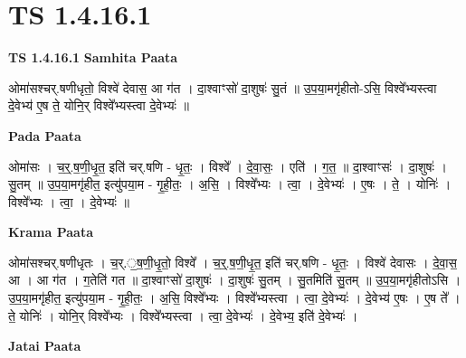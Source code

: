 \documentclass[17pt]{extarticle}
\begin{document}
\section*{ TS 1.4.16.1 }

\textbf{TS 1.4.16.1 } \newline
\textbf{Samhita Paata} \newline

ओमा॑सश्चर्.षणीधृतो॒ विश्वे॑ देवास॒ आ ग॑त । दा॒श्वाꣳसो॑ दा॒शुषः॑ सु॒तं ॥ उ॒प॒या॒मगृ॑हीतो-ऽसि॒ विश्वे᳚भ्यस्त्वा दे॒वेभ्य॑ ए॒ष ते॒ योनि॒र् विश्वे᳚भ्यस्त्वा दे॒वेभ्यः॑ ॥ \newline

\textbf{Pada Paata} \newline

ओमा॑सः । च॒र्॒.ष॒णी॒धृ॒त॒ इति॑ चर्.षणि - धृ॒तः॒ । विश्वे᳚ । दे॒वा॒सः॒ । एति॑ । ग॒त॒ ॥ दा॒श्वाꣳसः॑ । दा॒शुषः॑ । सु॒तम् ॥ उ॒प॒या॒मगृ॑हीत॒ इत्यु॑पया॒म - गृ॒ही॒तः॒ । अ॒सि॒ । विश्वे᳚भ्यः । त्वा॒ । दे॒वेभ्यः॑ । ए॒षः । ते॒ । योनिः॑ । विश्वे᳚भ्यः । त्वा॒ । दे॒वेभ्यः॑ ॥  \newline


\textbf{Krama Paata} \newline

ओमा॑सश्चर्.षणीधृतः । च॒र्.॒ष॒णी॒धृ॒तो॒ विश्वे᳚ । च॒र्॒.ष॒णी॒धृ॒त॒ इति॑ चर्.षणि - धृ॒तः॒ । विश्वे॑ देवासः । दे॒वा॒स॒ आ । आ ग॑त । ग॒तेति॑ गत ॥ दा॒श्वाꣳसो॑ दा॒शुषः॑ । दा॒शुषः॑ सु॒तम् । सु॒तमिति॑ सु॒तम् ॥ उ॒प॒या॒मगृ॑हीतोऽसि । उ॒प॒या॒मगृ॑हीत॒ इत्यु॑पया॒म - गृ॒ही॒तः॒ । अ॒सि॒ विश्वे᳚भ्यः । विश्वे᳚भ्यस्त्वा । त्वा॒ दे॒वेभ्यः॑ । दे॒वेभ्य॑ ए॒षः । ए॒ष ते᳚ । ते॒ योनिः॑ । योनि॒र् विश्वे᳚भ्यः । विश्वे᳚भ्यस्त्वा । त्वा॒ दे॒वेभ्यः॑ । दे॒वेभ्य॒ इति॑ दे॒वेभ्यः॑ । \newline

\textbf{Jatai Paata} \newline
\end{document}
